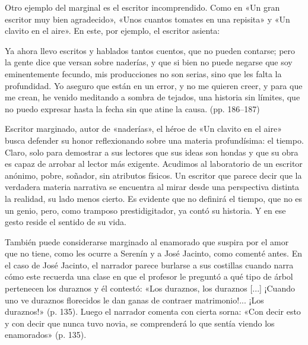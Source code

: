 \documentclass[14pt,twoside,final]{extbook} %
\begin{document}
Otro ejemplo del marginal es el escritor incomprendido. Como en «Un gran escritor muy bien agradecido», «Unos cuantos tomates en una repisita» y «Un clavito en el aire». En este, por ejemplo, el escritor asienta:
\begin{quoting}
Ya ahora llevo escritos y hablados tantos cuentos, que no pueden contarse; pero la gente dice que versan sobre naderías, y que si bien no puede negarse que soy eminentemente fecundo, mis producciones no son serias, sino que les falta la profundidad. Yo aseguro que están en un error, y no me quieren creer, y para que me crean, he venido meditando a sombra de tejados, una historia sin límites, que no puedo expresar hasta la fecha sin que atine la causa. (pp. 186--187)
\end{quoting}
Escritor marginado, autor de «naderías», el héroe de «Un clavito en el aire» busca defender su honor reflexionando sobre una materia profundísima: el tiempo. Claro, solo para demostrar a sus lectores que sus ideas son hondas y que su obra es capaz de arrobar al lector más exigente. Acudimos al laboratorio de un escritor anónimo, pobre, soñador, sin atributos físicos. Un escritor que parece decir que la verdadera materia narrativa se encuentra al mirar desde una perspectiva distinta la realidad, su lado menos cierto. Es evidente que no definirá el tiempo, que no es un genio, pero, como tramposo prestidigitador, ya contó su historia. Y en ese gesto reside el sentido de su vida.

También puede considerarse marginado al enamorado que suspira por el amor que no tiene, como les ocurre a Serenín y a José Jacinto, como comenté antes. En el caso de José Jacinto, el narrador parece burlarse a sus costillas cuando narra cómo este recuerda una clase en que el profesor le preguntó a qué tipo de árbol pertenecen los duraznos y él contestó: «Los duraznos, los duraznos [...] ¡Cuando uno ve duraznos florecidos le dan ganas de contraer matrimonio!... ¡Los duraznos!» (p. 135). Luego el narrador comenta con cierta sorna: «Con decir esto y con decir que nunca tuvo novia, se comprenderá lo que sentía viendo los enamorados» (p. 135).\protect\enlargethispage*{\baselineskip}
\end{document}
